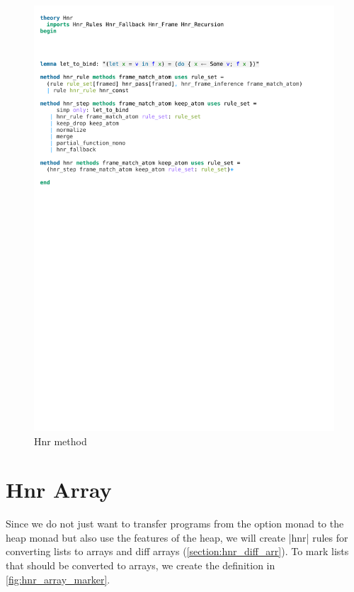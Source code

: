 \begin{figure}[htpb]
    \includegraphics[trim={0 18cm 0 10,8cm}, clip, width=1.00\textwidth]{figures/Theory_Hnr.pdf}
    \caption[Hnr method]{Hnr method}
    \label{fig:hnr_method}
\end{figure}

\section{Hnr Array}

Since we do not just want to transfer programs from the option monad to the heap monad but also use the features of the heap, we will create |hnr| rules for converting lists to arrays and diff arrays (\autoref{section:hnr_diff_arr}). 
To mark lists that should be converted to arrays, we create the definition in \autoref{fig:hnr_array_marker}.

